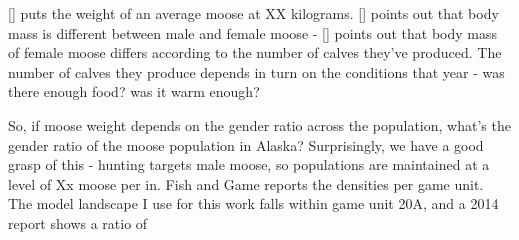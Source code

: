 \documentclass[
  letterpaper,
  DIV=11,
  numbers=noendperiod,
  oneside]{scrartcl}
\begin{document}
{[}{]} puts the weight of an average moose at XX kilograms. {[}{]}
points out that body mass is different between male and female moose -
{[}{]} points out that body mass of female moose differs according to
the number of calves they've produced. The number of calves they produce
depends in turn on the conditions that year - was there enough food? was
it warm enough?

So, if moose weight depends on the gender ratio across the population,
what's the gender ratio of the moose population in Alaska? Surprisingly,
we have a good grasp of this - hunting targets male moose, so
populations are maintained at a level of Xx moose per in. Fish and Game
reports the densities per game unit. The model landscape I use for this
work falls within game unit 20A, and a 2014 report shows a ratio of
\end{document}
